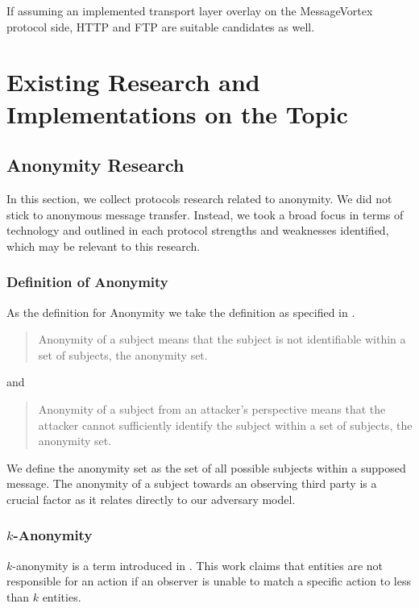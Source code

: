 
If assuming an implemented transport layer overlay on the MessageVortex protocol side, HTTP and FTP are suitable candidates as well.

\chapter{Existing Research and Implementations on the Topic \label{sec:existingRD}}
\section{Anonymity Research}
In this section, we collect protocols research related to anonymity. We did not stick to anonymous message transfer. Instead, we took a broad focus in terms of technology and outlined in each protocol strengths and weaknesses identified, which may be relevant to this research.

\subsection{Definition of Anonymity}
As the definition for Anonymity we take the definition as specified in \cite{anonTerminology}.

\begin{quote}
	Anonymity of a subject means that the subject is not identifiable within a set of subjects, the anonymity set.\omitted
\end{quote}
and
\begin{quote}
	Anonymity of a subject from an attacker's perspective means that the attacker cannot sufficiently identify the subject within a set of subjects, the anonymity set.\omitted
\end{quote}

We define the anonymity set as the set of all possible subjects within a supposed message. The anonymity of a subject towards an observing third party is a crucial factor as it relates directly to our adversary model.

\subsection{\texorpdfstring{$k$}{k}-Anonymity}
$k$-anonymity is a term introduced in \cite{k-anonymous:ccs2003}. This work claims that entities are not responsible for an action if an observer is unable to match a specific action to less than $k$ entities.

